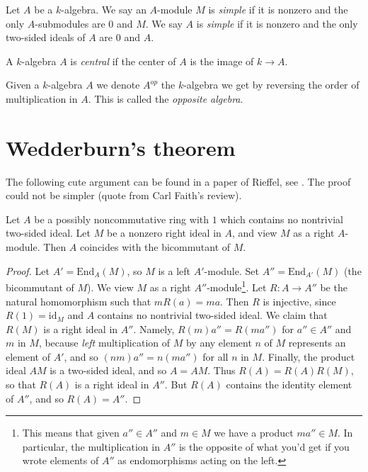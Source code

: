 \begin{definition}
\label{definition-simple}
Let $A$ be a $k$-algebra.
We say an $A$-module $M$ is {\it simple} if it is nonzero and
the only $A$-submodules are $0$ and $M$.
We say $A$ is {\it simple} if it is nonzero and the only two-sided
ideals of $A$ are $0$ and $A$.
\end{definition}

\begin{definition}
\label{definition-central}
A $k$-algebra $A$ is {\it central} if the center of $A$ is the image of
$k \to A$.
\end{definition}

\begin{definition}
\label{definition-opposite}
Given a $k$-algebra $A$ we denote $A^{op}$ the $k$-algebra we get by
reversing the order of multiplication in $A$. This is called the
{\it opposite algebra}.
\end{definition}




\section{Wedderburn's theorem}
\label{section-wedderburn}

\noindent
The following cute argument can be found in a paper of Rieffel, see
\cite{Rieffel}. The proof could not be simpler (quote from
Carl Faith's review).

\begin{lemma}
\label{lemma-rieffel}
Let $A$ be a possibly noncommutative ring with $1$ which contains no
nontrivial two-sided ideal. Let $M$ be a nonzero right ideal in $A$,
and view $M$ as a right $A$-module. Then $A$ coincides with the
bicommutant of $M$.
\end{lemma}

\begin{proof}
Let $A' = \text{End}_A(M)$, so $M$ is a left $A'$-module.
Set $A'' = \text{End}_{A'}(M)$ (the bicommutant of $M$).
We view $M$ as a right $A''$-module\footnote{This
means that given $a'' \in A''$ and $m \in M$ we have a product
$m a'' \in M$. In particular, the multiplication in $A''$
is the opposite of what you'd get if you wrote elements of $A''$
as endomorphisms acting on the left.}.
Let $R : A \to A''$ be the natural homomorphism such that
$mR(a) = ma$. Then $R$ is injective, since $R(1) = \text{id}_M$
and $A$ contains no nontrivial two-sided ideal. We claim that $R(M)$
is a right ideal in $A''$. Namely, $R(m)a'' = R(ma'')$ for $a'' \in A''$
and $m$ in $M$, because {\it left} multiplication of $M$ by any element $n$
of $M$ represents an element of $A'$, and so
$(nm)a'' = n(ma'')$ for all $n$ in $M$.
Finally, the product ideal $AM$ is a two-sided ideal, and so
$A = AM$. Thus $R(A) = R(A)R(M)$, so that $R(A)$ is a right ideal in $A''$.
But $R(A)$ contains the identity element of $A''$, and so $R(A) = A''$.
\end{proof}

